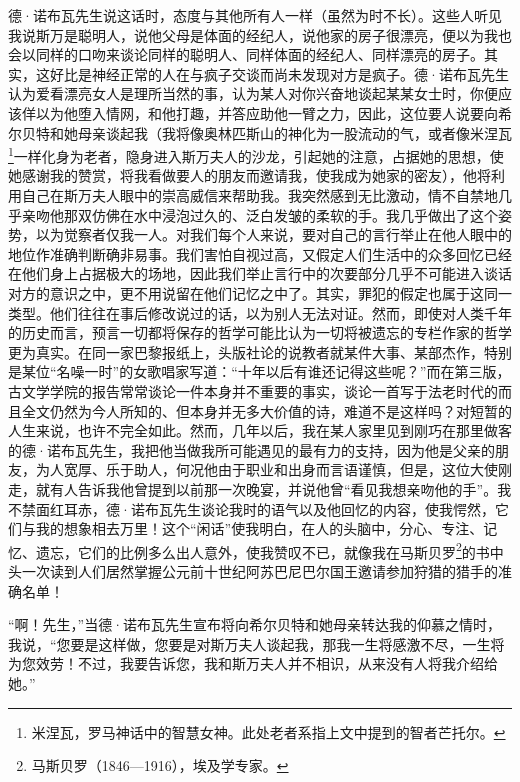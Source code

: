 \par 德·诺布瓦先生说这话时，态度与其他所有人一样（虽然为时不长）。这些人听见我说斯万是聪明人，说他父母是体面的经纪人，说他家的房子很漂亮，便以为我也会以同样的口吻来谈论同样的聪明人、同样体面的经纪人、同样漂亮的房子。其实，这好比是神经正常的人在与疯子交谈而尚未发现对方是疯子。德·诺布瓦先生认为爱看漂亮女人是理所当然的事，认为某人对你兴奋地谈起某某女士时，你便应该佯以为他堕入情网，和他打趣，并答应助他一臂之力，因此，这位要人说要向希尔贝特和她母亲谈起我（我将像奥林匹斯山的神化为一股流动的气，或者像米涅瓦\footnote{米涅瓦，罗马神话中的智慧女神。此处老者系指上文中提到的智者芒托尔。}一样化身为老者，隐身进入斯万夫人的沙龙，引起她的注意，占据她的思想，使她感谢我的赞赏，将我看做要人的朋友而邀请我，使我成为她家的密友），他将利用自己在斯万夫人眼中的崇高威信来帮助我。我突然感到无比激动，情不自禁地几乎亲吻他那双仿佛在水中浸泡过久的、泛白发皱的柔软的手。我几乎做出了这个姿势，以为觉察者仅我一人。对我们每个人来说，要对自己的言行举止在他人眼中的地位作准确判断确非易事。我们害怕自视过高，又假定人们生活中的众多回忆已经在他们身上占据极大的场地，因此我们举止言行中的次要部分几乎不可能进入谈话对方的意识之中，更不用说留在他们记忆之中了。其实，罪犯的假定也属于这同一类型。他们往往在事后修改说过的话，以为别人无法对证。然而，即使对人类千年的历史而言，预言一切都将保存的哲学可能比认为一切将被遗忘的专栏作家的哲学更为真实。在同一家巴黎报纸上，头版社论的说教者就某件大事、某部杰作，特别是某位“名噪一时”的女歌唱家写道：“十年以后有谁还记得这些呢？”而在第三版，古文学学院的报告常常谈论一件本身并不重要的事实，谈论一首写于法老时代的而且全文仍然为今人所知的、但本身并无多大价值的诗，难道不是这样吗？对短暂的人生来说，也许不完全如此。然而，几年以后，我在某人家里见到刚巧在那里做客的德·诺布瓦先生，我把他当做我所可能遇见的最有力的支持，因为他是父亲的朋友，为人宽厚、乐于助人，何况他由于职业和出身而言语谨慎，但是，这位大使刚走，就有人告诉我他曾提到以前那一次晚宴，并说他曾“看见我想亲吻他的手”。我不禁面红耳赤，德·诺布瓦先生谈论我时的语气以及他回忆的内容，使我愕然，它们与我的想象相去万里！这个“闲话”使我明白，在人的头脑中，分心、专注、记忆、遗忘，它们的比例多么出人意外，使我赞叹不已，就像我在马斯贝罗\footnote{马斯贝罗（1846—1916），埃及学专家。}的书中头一次读到人们居然掌握公元前十世纪阿苏巴尼巴尔国王邀请参加狩猎的猎手的准确名单！
\par “啊！先生，”当德·诺布瓦先生宣布将向希尔贝特和她母亲转达我的仰慕之情时，我说，“您要是这样做，您要是对斯万夫人谈起我，那我一生将感激不尽，一生将为您效劳！不过，我要告诉您，我和斯万夫人并不相识，从来没有人将我介绍给她。”
